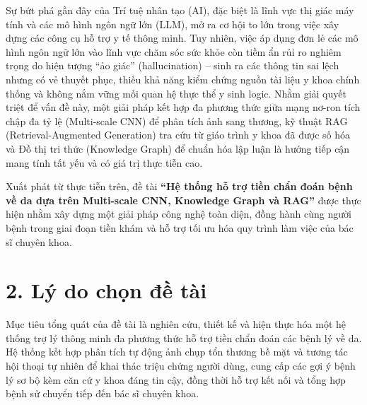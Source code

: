Sự bứt phá gần đây của Trí tuệ nhân tạo (AI), đặc biệt là lĩnh vực thị giác máy tính và các mô hình ngôn ngữ lớn (LLM), mở ra cơ hội to lớn trong việc xây dựng các công cụ hỗ trợ y tế thông minh. Tuy nhiên, việc áp dụng đơn lẻ các mô hình ngôn ngữ lớn vào lĩnh vực chăm sóc sức khỏe còn tiềm ẩn rủi ro nghiêm trọng do hiện tượng ``ảo giác'' (hallucination) -- sinh ra các thông tin sai lệch nhưng có vẻ thuyết phục, thiếu khả năng kiểm chứng nguồn tài liệu y khoa chính thống và không nắm vững mối quan hệ thực thể y sinh logic. Nhằm giải quyết triệt để vấn đề này, một giải pháp kết hợp đa phương thức giữa mạng nơ-ron tích chập đa tỷ lệ (Multi-scale CNN) để phân tích ảnh sang thương, kỹ thuật RAG (Retrieval-Augmented Generation) tra cứu từ giáo trình y khoa đã được số hóa và Đồ thị tri thức (Knowledge Graph) để chuẩn hóa lập luận là hướng tiếp cận mang tính tất yếu và có giá trị thực tiễn cao.

Xuất phát từ thực tiễn trên, đề tài \textbf{``Hệ thống hỗ trợ tiền chẩn đoán bệnh về da dựa trên Multi-scale CNN, Knowledge Graph và RAG''} được thực hiện nhằm xây dựng một giải pháp công nghệ toàn diện, đồng hành cùng người bệnh trong giai đoạn tiền khám và hỗ trợ tối ưu hóa quy trình làm việc của bác sĩ chuyên khoa.

\section*{2. Lý do chọn đề tài}

Mục tiêu tổng quát của đề tài là nghiên cứu, thiết kế và hiện thực hóa một hệ thống trợ lý thông minh đa phương thức hỗ trợ tiền chẩn đoán các bệnh lý về da. Hệ thống kết hợp phân tích tự động ảnh chụp tổn thương bề mặt và tương tác hội thoại tự nhiên để khai thác triệu chứng người dùng, cung cấp các gợi ý bệnh lý sơ bộ kèm căn cứ y khoa đáng tin cậy, đồng thời hỗ trợ kết nối và tổng hợp bệnh sử chuyển tiếp đến bác sĩ chuyên khoa.

